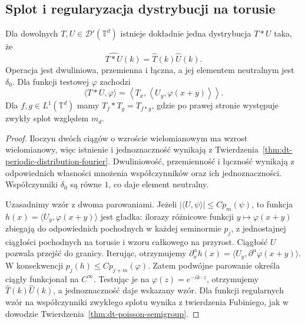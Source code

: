 \subsection{Splot i regularyzacja dystrybucji na torusie}

\begin{twierdzenie}
\label{thm:dt-periodic-convolution}
Dla dowolnych $T,U\in\mathcal D'(\mathbb T^d)$
istnieje dokładnie jedna dystrybucja $T*U$ taka, że
\[
 \widehat{T*U}(k)=\widehat T(k)\widehat U(k).
\]
Operacja jest dwuliniowa, przemienna i łączna,
a jej elementem neutralnym jest $\delta_0$.
Dla funkcji testowej $\varphi$ zachodzi
\[
 \langle T*U,\varphi\rangle
 =\left\langle T_x,
   \left\langle U_y,\varphi(x+y)\right\rangle
 \right\rangle.
\]
Dla $f,g\in L^1(\mathbb T^d)$ mamy
$T_f*T_g=T_{f*g}$, gdzie po prawej stronie
występuje zwykły splot względem $m_d$.
\end{twierdzenie}
\begin{proof}
Iloczyn dwóch ciągów o wzroście wielomianowym
ma wzrost wielomianowy, więc istnienie
i jednoznaczność wynikają z
Twierdzenia~\ref{thm:dt-periodic-distribution-fourier}.
Dwuliniowość, przemienność i łączność wynikają
z odpowiednich własności mnożenia współczynników
oraz ich jednoznaczności. Współczynniki $\delta_0$
są równe $1$, co daje element neutralny.

Uzasadnimy wzór z dwoma parowaniami.
Jeżeli $|\langle U,\psi\rangle|\le Cp_m(\psi)$,
to funkcja $h(x)=\langle U_y,\varphi(x+y)\rangle$
jest gładka: ilorazy różnicowe funkcji
$y\mapsto\varphi(x+y)$ zbiegają do odpowiednich
pochodnych w każdej seminormie $p_j$,
z jednostajnej ciągłości pochodnych na torusie
i wzoru całkowego na przyrost.
Ciągłość $U$ pozwala przejść do granicy.
Iterując, otrzymujemy
$\partial_x^\alpha h(x)=
\langle U_y,\partial^\alpha\varphi(x+y)\rangle$.
W konsekwencji $p_j(h)\le Cp_{j+m}(\varphi)$.
Zatem podwójne parowanie określa ciągły funkcjonał
na $C^\infty$. Testując je na
$\varphi(z)=e^{-ik\cdot z}$, otrzymujemy
$\widehat T(k)\widehat U(k)$, a jednoznaczność
daje wskazany wzór.
Dla funkcji regularnych wzór na współczynniki
zwykłego splotu wynika z twierdzenia Fubiniego,
jak w dowodzie Twierdzenia~\ref{thm:dt-poisson-semigroup}.
\end{proof}

